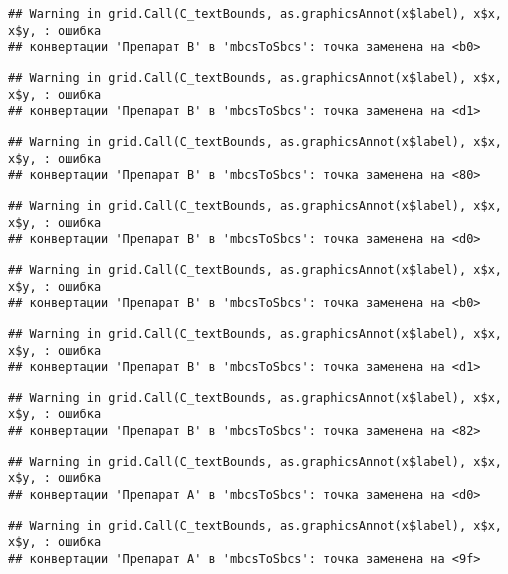 \documentclass[
]{article}
\begin{document}
\begin{verbatim}
## Warning in grid.Call(C_textBounds, as.graphicsAnnot(x$label), x$x, x$y, : ошибка
## конвертации 'Препарат B' в 'mbcsToSbcs': точка заменена на <b0>
\end{verbatim}

\begin{verbatim}
## Warning in grid.Call(C_textBounds, as.graphicsAnnot(x$label), x$x, x$y, : ошибка
## конвертации 'Препарат B' в 'mbcsToSbcs': точка заменена на <d1>
\end{verbatim}

\begin{verbatim}
## Warning in grid.Call(C_textBounds, as.graphicsAnnot(x$label), x$x, x$y, : ошибка
## конвертации 'Препарат B' в 'mbcsToSbcs': точка заменена на <80>
\end{verbatim}

\begin{verbatim}
## Warning in grid.Call(C_textBounds, as.graphicsAnnot(x$label), x$x, x$y, : ошибка
## конвертации 'Препарат B' в 'mbcsToSbcs': точка заменена на <d0>
\end{verbatim}

\begin{verbatim}
## Warning in grid.Call(C_textBounds, as.graphicsAnnot(x$label), x$x, x$y, : ошибка
## конвертации 'Препарат B' в 'mbcsToSbcs': точка заменена на <b0>
\end{verbatim}

\begin{verbatim}
## Warning in grid.Call(C_textBounds, as.graphicsAnnot(x$label), x$x, x$y, : ошибка
## конвертации 'Препарат B' в 'mbcsToSbcs': точка заменена на <d1>
\end{verbatim}

\begin{verbatim}
## Warning in grid.Call(C_textBounds, as.graphicsAnnot(x$label), x$x, x$y, : ошибка
## конвертации 'Препарат B' в 'mbcsToSbcs': точка заменена на <82>
\end{verbatim}

\begin{verbatim}
## Warning in grid.Call(C_textBounds, as.graphicsAnnot(x$label), x$x, x$y, : ошибка
## конвертации 'Препарат A' в 'mbcsToSbcs': точка заменена на <d0>
\end{verbatim}

\begin{verbatim}
## Warning in grid.Call(C_textBounds, as.graphicsAnnot(x$label), x$x, x$y, : ошибка
## конвертации 'Препарат A' в 'mbcsToSbcs': точка заменена на <9f>
\end{verbatim}
\end{document}

